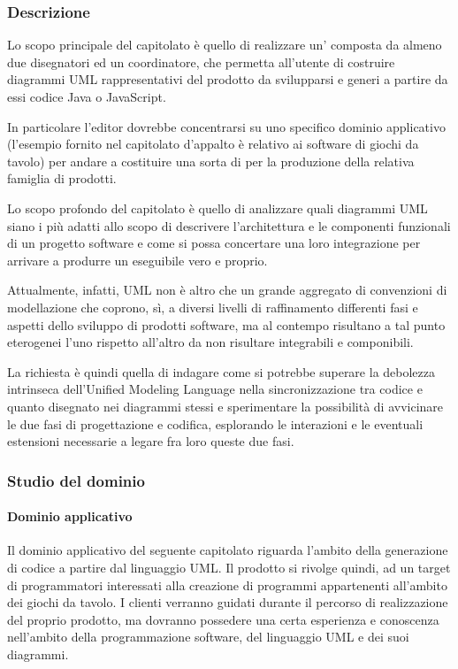 		\subsubsection{Descrizione}
		Lo scopo principale del capitolato è quello di realizzare un' composta da almeno due disegnatori
		ed un coordinatore, che permetta all'utente di costruire diagrammi UML rappresentativi del prodotto da svilupparsi e generi a partire da essi codice Java o JavaScript.
		
		In particolare l'editor dovrebbe concentrarsi su uno specifico dominio applicativo (l'esempio fornito nel capitolato d'appalto è relativo ai software di giochi da tavolo) per andare a costituire una sorta di  per la produzione della relativa famiglia di prodotti.

		Lo scopo profondo del capitolato è quello di analizzare quali diagrammi UML siano i più adatti allo scopo di descrivere l'architettura 
		e le componenti funzionali di un progetto software e come si possa concertare una loro integrazione per arrivare a produrre un eseguibile vero e proprio. 

		Attualmente, infatti, UML non è altro che un grande aggregato di convenzioni di modellazione che coprono, sì, a diversi livelli di raffinamento differenti fasi e aspetti dello sviluppo di prodotti software, ma al contempo risultano a tal punto eterogenei l'uno rispetto all'altro da non risultare integrabili e componibili. 

		La richiesta è quindi quella di indagare come si potrebbe superare la debolezza intrinseca dell'Unified Modeling Language nella sincronizzazione tra codice e quanto disegnato nei diagrammi stessi e sperimentare la possibilità di avvicinare le due fasi di progettazione e codifica, esplorando le interazioni e le eventuali estensioni necessarie a legare fra loro queste due fasi.
		\subsubsection{Studio del dominio}
			\paragraph{Dominio applicativo} Il dominio applicativo del seguente capitolato riguarda l'ambito della generazione di codice a partire dal linguaggio UML. Il prodotto si rivolge quindi, ad un target di programmatori interessati alla creazione di programmi appartenenti all'ambito dei giochi da tavolo. I clienti verranno guidati durante il percorso di realizzazione del proprio prodotto, ma dovranno possedere una certa esperienza e conoscenza nell'ambito della programmazione software, del linguaggio UML e dei suoi diagrammi.
			
